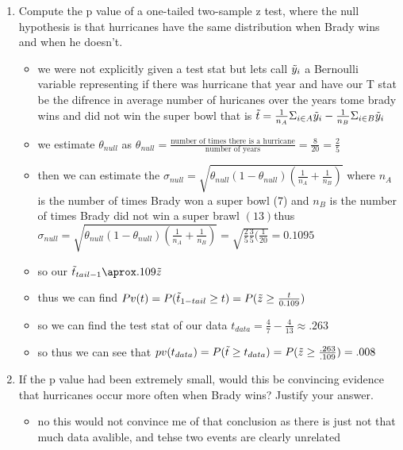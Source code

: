\documentclass[12pt,twoside]{article}
\begin{document}
\begin{enumerate}
\begin{center}
{\begin{tabular}
\hline
\end{tabular}
}
\endgroup
\end{center}
\begin{enumerate}
\item Compute the p value of a one-tailed two-sample z test, where the null hypothesis is that hurricanes have the same distribution when Brady wins and when he doesn't. 
\begin{itemize}
    \color{blue}
    \item we were not explicitly given a test stat but lets call $\Tilde{y}_{i}$ a Bernoulli variable representing if there was hurricane that year and have our T stat be the difrence in average number of huricanes over the years tome brady wins and did not win the super bowl that is $\Tilde{t}=\frac{1}{n_A}\Sigma_{i\in A}\Tilde{y}_i-\frac{1}{n_B}\Sigma_{i\in B}\Tilde{y}_i$
    
    \item we estimate $\theta_{null}$ as $\theta_{null}=\frac{\text{number of times there is a hurricane}}{\text{number of years}}=\frac{8}{20}=\frac{2}{5}$
    \item then we can estimate the $\sigma_{null}=\sqrt{\theta_{null}(1-\theta_{null})(\frac{1}{n_A}+\frac{1}{n_B})}$ where $n_A$ is the number of times Brady won a super bowl (7) and $n_B$ is the number of times Brady did not win a super brawl $(13)$thus $\sigma_{null}=\sqrt{\theta_{null}(1-\theta_{null})(\frac{1}{n_A}+\frac{1}{n_B})}=\sqrt{\frac{2}{5}\frac{3}{5}(\frac{1}{20}}=0.1095$
    \item so our $\Tilde{t}_{tail-1}\aprox.109\Tilde{z}$
    \item thus we can find $Pv(t)=P(\Tilde{t}_{1-tail}\geq t)=P(\Tilde{z}\geq \frac{t}{0.109})$ \item so we can find the test stat of our data  ${t}_{data}=\frac{4}{7}-\frac{4}{13}\approx .263$
    \item so thus we can see that $pv({t}_{data})=P(\Tilde{t}\geq {t}_{data})=P(\Tilde{z}\geq \frac{.263}{.109})=.008$
\end{itemize}

\item If the p value had been extremely small, would this be convincing evidence that hurricanes occur more often when Brady wins? Justify your answer.
\begin{itemize}
    \color{blue}
    \item no this would not convince me of that conclusion as there is just not that much data avalible, and tehse two events are clearly unrelated
\end{itemize}
\end{enumerate}
\newpage






\end{enumerate}
\end{document}

